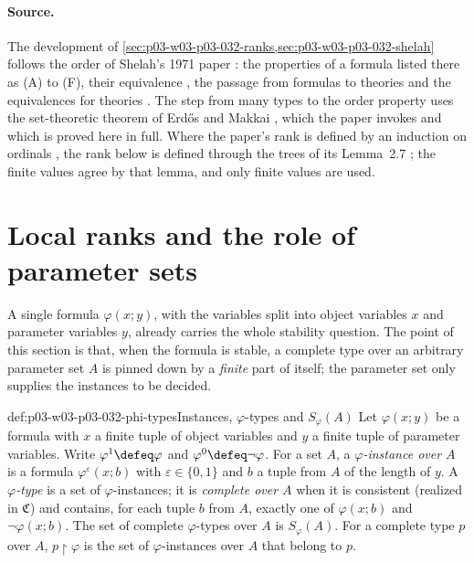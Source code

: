 \paragraph{Source.}
The development of
\cref{sec:p03-w03-p03-032-ranks,sec:p03-w03-p03-032-shelah} follows the order
of Shelah's 1971 paper \cite[\S~2, pp.~296--305]{Shelah1971Stability}: the
properties of a formula listed there as (A) to (F), their equivalence
\cite[Theorem~2.9, p.~303]{Shelah1971Stability}, the passage from formulas to
theories \cite[Lemmas~2.10--2.12, pp.~303--304]{Shelah1971Stability} and
the equivalences for theories \cite[Theorem~2.13,
pp.~304--305]{Shelah1971Stability}.  The step from many types to the order
property uses the set-theoretic theorem of Erd\H{o}s and Makkai
\cite[Theorem]{ErdosMakkai1966}, which the paper invokes
\cite[Lemma~2.1, p.~298]{Shelah1971Stability} and which is proved here in
full.  Where the paper's rank is defined by an induction on ordinals
\cite[Definitions~2.4--2.5, pp.~299--300]{Shelah1971Stability}, the rank
below is defined through the trees of its Lemma~2.7
\cite[Lemma~2.7, pp.~301--302]{Shelah1971Stability}; the finite values agree
by that lemma, and only finite values are used.

\section{Local ranks and the role of parameter sets}
\label{sec:p03-w03-p03-032-ranks}

A single formula \(\varphi(x;y)\), with the variables split into object
variables \(x\) and parameter variables \(y\), already carries the whole
stability question.  The point of this section is that, when the formula is
stable, a complete type over an arbitrary parameter set \(A\) is pinned down
by a \emph{finite} part of itself; the parameter set only supplies the
instances to be decided.

\begin{hbdefinition}{def:p03-w03-p03-032-phi-types}{Instances, \(\varphi\)-types and \(S_\varphi(A)\)}
Let \(\varphi(x;y)\) be a formula with \(x\) a finite tuple of object
variables and \(y\) a finite tuple of parameter variables.  Write
\(\varphi^1\defeq\varphi\) and \(\varphi^0\defeq\neg\varphi\).  For a set
\(A\), a \emph{\(\varphi\)-instance over \(A\)} is a formula
\(\varphi^\varepsilon(x;b)\) with \(\varepsilon\in\{0,1\}\) and \(b\) a tuple
from \(A\) of the length of \(y\).  A \emph{\(\varphi\)-type} is a set of
\(\varphi\)-instances; it is \emph{complete over \(A\)} when it is consistent
(realized in \(\mathfrak C\)) and contains, for each tuple \(b\) from \(A\),
exactly one of \(\varphi(x;b)\) and \(\neg\varphi(x;b)\).  The set of
complete \(\varphi\)-types over \(A\) is \(S_\varphi(A)\).  For a complete
type \(p\) over \(A\), \(p\mathbin{\upharpoonright}\varphi\) is the set of
\(\varphi\)-instances over \(A\) that belong to \(p\).
\end{hbdefinition}

